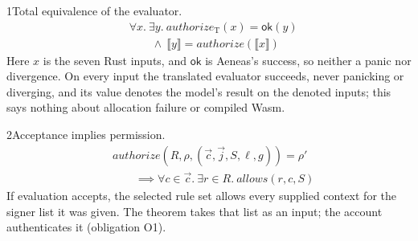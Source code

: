 \begin{perchstatement}{1}{Total equivalence of the evaluator.}\label{stmt:total-equivalence-of-the-evaluator}
\[\begin{aligned}&\forall x.\ \exists y.\ \mathit{authorize}_{\mathrm{T}}(x) = \mathsf{ok}(y)\\
&\qquad \land\ \llbracket y \rrbracket = \mathit{authorize}(\llbracket x \rrbracket)\end{aligned}\]
Here \(x\) is the seven Rust inputs, and \(\mathsf{ok}\) is Aeneas's success, so neither a panic nor divergence. On every input the translated evaluator succeeds, never panicking or diverging, and its value denotes the model's result on the denoted inputs; this says nothing about allocation failure or compiled Wasm.
\end{perchstatement}
\begin{perchstatement}{2}{Acceptance implies permission.}\label{stmt:acceptance-implies-permission}
\[\begin{aligned}&\mathit{authorize}(R, \rho, (\vec c, \vec j, S, \ell, g)) = \rho'\\
&\qquad \implies \forall c \in \vec c.\ \exists r \in R.\ \mathit{allows}(r, c, S)\end{aligned}\]
If evaluation accepts, the selected rule set allows every supplied context for the signer list it was given. The theorem takes that list as an input; the account authenticates it (obligation O1).
\end{perchstatement}
